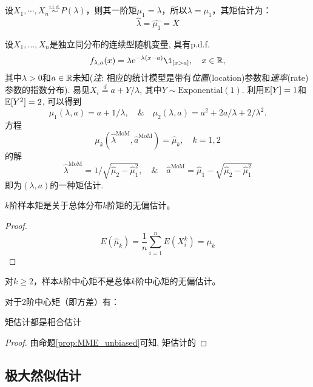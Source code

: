 \begin{example}[泊松分布的矩估计]\label{moment_estimate_Poisson}
    设$X_1, \cdots ,X_n \overset{\text{i.i.d.}}{\sim} P(\lambda)$，则其一阶矩$\mu_1=\lambda$，所以$\lambda=\mu_1$，其矩估计为：
    \[ \hat{\lambda} = \hat{\mu_1} = \overline{X} \]
\end{example}

\begin{example}
    设$X_1,\dots,X_n$是独立同分布的连续型随机变量, 具有p.d.f.
    \[ f_{\lambda,a}(x) = \lambda\mathrm{e}^{-\lambda(x-a)}\1_{[x>a]}, \quad x\in\R, \]
    其中$\lambda > 0$和$a \in \mathbb{R}$未知(\emph{注}: 相应的统计模型是带有\emph{位置}(location)参数和\emph{速率}(rate)参数的指数分布). 易见$X_i \stackrel{d}{=} a + Y/\lambda$, 其中$Y \sim \mathrm{Exponential}(1)$. 利用$\mathbb{E}[Y]=1$和$\mathbb{E}[Y^2] = 2$, 可以得到
    \[ \mu_1(\lambda,a) = a + 1/\lambda, \quad\&\quad
        \mu_2(\lambda,a) = a^2 + 2a/\lambda + 2/\lambda^2 . \]
    方程
    \[ \mu_{k}(\hat{\lambda}^{\mathrm{MoM}},\hat{a}^{\mathrm{MoM}}) = \hat{\mu}_{k}, \quad k = 1,2 \]
    的解
    \[ \hat{\lambda}^{\mathrm{MoM}} = 1\Big/\sqrt{\hat{\mu}_2-\hat{\mu}_1^2}, \quad\&\quad
        \hat{a}^{\mathrm{MoM}} = \hat{\mu}_1-\sqrt{\hat{\mu}_2-\hat{\mu}_1^2} \]
    即为$(\lambda,a)$的一种矩估计.
\end{example}

\begin{proposition}[矩估计的无偏性]\label{prop:MME_unbiased}
    $k$阶样本矩是关于总体分布$k$阶矩的无偏估计。
\end{proposition}
\begin{proof}
    \[ E(\hat\mu_k)=\frac1n \sum_{i=1}^n E(X_i^k)=\mu_k \]
\end{proof}

\begin{remark}
    对$k\ge 2$，样本$k$阶中心矩不是总体$k$阶中心矩的无偏估计。
\end{remark}

\begin{example}
    对于2阶中心矩（即方差）有：
    
\end{example}

\begin{proposition}[矩估计的相合性]
    矩估计都是相合估计
\end{proposition}
\begin{proof}
    由命题\ref{prop:MME_unbiased}可知, 矩估计的
\end{proof}

\subsection{极大然似估计}

